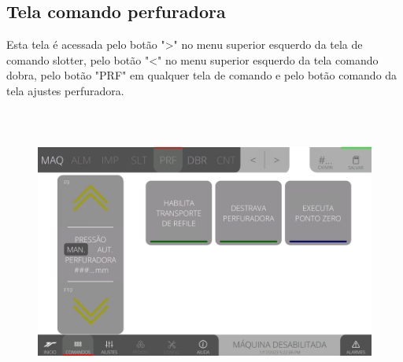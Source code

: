 \thispagestyle{fancy}
\vspace*{40 pt}
\subsection{Tela comando perfuradora}\label{telaComandoPerfuradora}
 Esta tela é acessada pelo botão "\textgreater" no menu superior esquerdo da tela de comando slotter, pelo botão "\textless{}" no menu superior esquerdo da tela comando dobra, pelo botão "PRF" em qualquer tela de comando e pelo botão comando da tela ajustes perfuradora.
 \vspace*{\fill}
 \begin{figure}[h]
  \centering
  \includegraphics[width=576px,height=360px]{src/imagesFlexo/06-drilling/commands/e-Tela-Principal.png}
\end{figure}
\vspace*{\fill}

\newpage
\thispagestyle{fancy}
\vspace*{40 pt}
